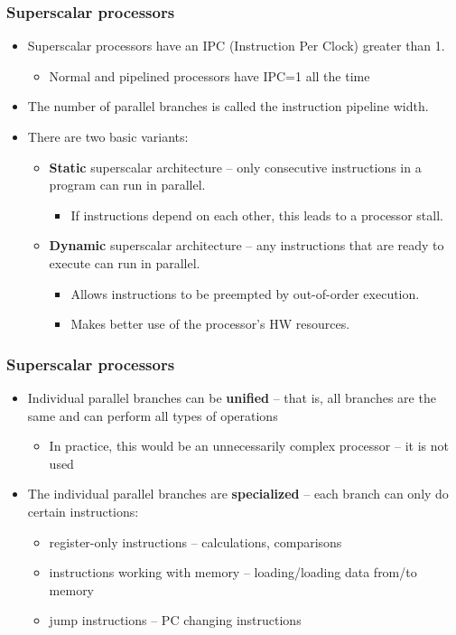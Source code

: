 \documentclass{beamer}
\begin{document}
\begin{frame}
\frametitle{Superscalar processors}

\begin{itemize}
\item Superscalar processors have an IPC (Instruction Per Clock) greater than 1.
  \begin{itemize}
  \item Normal and pipelined processors have IPC=1 all the time
  \end{itemize}
\item The number of parallel branches is called the instruction pipeline width.
\item There are two basic variants:
  \begin{itemize}
  \item \textbf{Static} superscalar architecture -- only consecutive instructions in a program can run in parallel.
    \begin{itemize}
    \item If instructions depend on each other, this leads to a processor stall.
    \end{itemize}
  \item \textbf{Dynamic} superscalar architecture -- any instructions that are ready to execute can run in parallel.
    \begin{itemize}
    \item Allows instructions to be preempted by out-of-order execution.
    \item Makes better use of the processor's HW resources.
    \end{itemize}
  \end{itemize}
\end{itemize}

\end{frame}

\begin{frame}
\frametitle{Superscalar processors}

\begin{itemize}
\item Individual parallel branches can be \textbf{unified} -- that is, all branches are the same and can perform all types of operations
  \begin{itemize}
  \item In practice, this would be an unnecessarily complex processor -- it is not used
  \end{itemize}
\item The individual parallel branches are \textbf{specialized} -- each branch can only do certain instructions:
  \begin{itemize}
  \item register-only instructions -- calculations, comparisons
  \item instructions working with memory -- loading/loading data from/to memory
  \item jump instructions -- PC changing instructions
  \end{itemize}
\end{itemize}
\end{frame}
\end{document}
